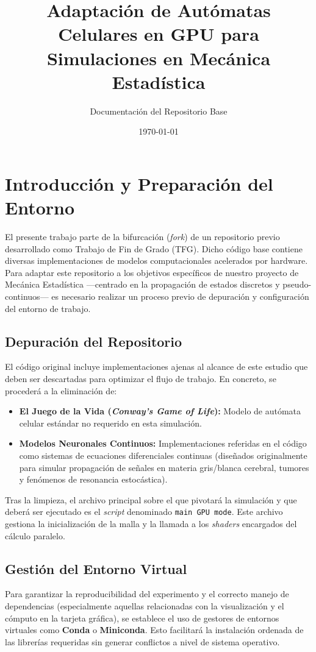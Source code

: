 \documentclass[12pt,a4paper]{article}
\title{\textbf{Adaptación de Autómatas Celulares en GPU para Simulaciones en Mecánica Estadística}}
\author{Documentación del Repositorio Base}
\date{\today}
\begin{document}
\maketitle

\tableofcontents
\newpage

\section{Introducción y Preparación del Entorno}

El presente trabajo parte de la bifurcación (\textit{fork}) de un repositorio previo desarrollado como Trabajo de Fin de Grado (TFG). Dicho código base contiene diversas implementaciones de modelos computacionales acelerados por hardware. Para adaptar este repositorio a los objetivos específicos de nuestro proyecto de Mecánica Estadística —centrado en la propagación de estados discretos y pseudo-continuos— es necesario realizar un proceso previo de depuración y configuración del entorno de trabajo.

\subsection{Depuración del Repositorio}
El código original incluye implementaciones ajenas al alcance de este estudio que deben ser descartadas para optimizar el flujo de trabajo. En concreto, se procederá a la eliminación de:
\begin{itemize}
    \item \textbf{El Juego de la Vida (\textit{Conway's Game of Life}):} Modelo de autómata celular estándar no requerido en esta simulación.
    \item \textbf{Modelos Neuronales Continuos:} Implementaciones referidas en el código como sistemas de ecuaciones diferenciales continuas (diseñados originalmente para simular propagación de señales en materia gris/blanca cerebral, tumores y fenómenos de resonancia estocástica).
\end{itemize}

Tras la limpieza, el archivo principal sobre el que pivotará la simulación y que deberá ser ejecutado es el \textit{script} denominado \texttt{main GPU mode}. Este archivo gestiona la inicialización de la malla y la llamada a los \textit{shaders} encargados del cálculo paralelo.

\subsection{Gestión del Entorno Virtual}
Para garantizar la reproducibilidad del experimento y el correcto manejo de dependencias (especialmente aquellas relacionadas con la visualización y el cómputo en la tarjeta gráfica), se establece el uso de gestores de entornos virtuales como \textbf{Conda} o \textbf{Miniconda}. Esto facilitará la instalación ordenada de las librerías requeridas sin generar conflictos a nivel de sistema operativo.
\end{document}
